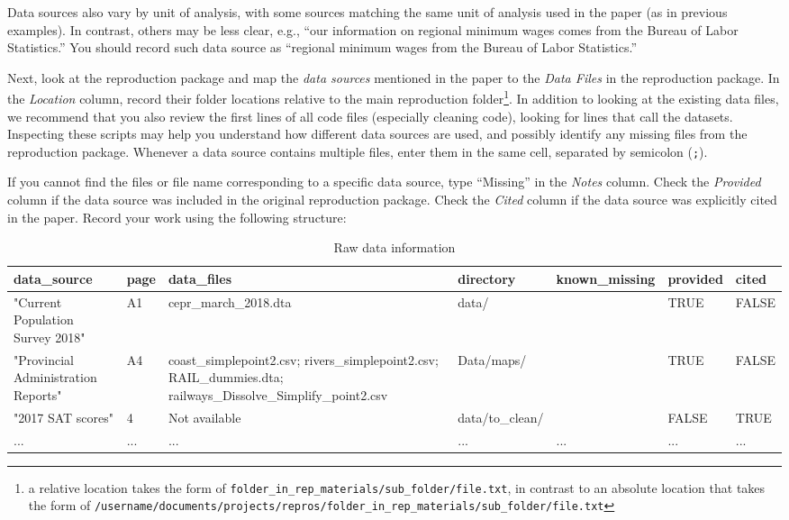 \documentclass[
]{book}
\begin{document}
Data sources also vary by unit of analysis, with some sources matching the same unit of analysis used in the paper (as in previous examples). In contrast, others may be less clear, e.g., ``our information on regional minimum wages comes from the Bureau of Labor Statistics.'' You should record such data source as ``regional minimum wages from the Bureau of Labor Statistics.''

Next, look at the reproduction package and map the \emph{data sources} mentioned in the paper to the \emph{Data Files} in the reproduction package. In the \emph{Location} column, record their folder locations relative to the main reproduction folder\footnote{a relative location takes the form of \texttt{folder\_in\_rep\_materials/sub\_folder/file.txt}, in contrast to an absolute location that takes the form of \texttt{/username/documents/projects/repros/folder\_in\_rep\_materials/sub\_folder/file.txt}}. In addition to looking at the existing data files, we recommend that you also review the first lines of all code files (especially cleaning code), looking for lines that call the datasets. Inspecting these scripts may help you understand how different data sources are used, and possibly identify any missing files from the reproduction package. Whenever a data source contains multiple files, enter them in the same cell, separated by semicolon (\texttt{;}).

If you cannot find the files or file name corresponding to a specific data source, type ``Missing'' in the \emph{Notes} column. Check the \emph{Provided} column if the data source was included in the original reproduction package. Check the \emph{Cited} column if the data source was explicitly cited in the paper. Record your work using the following structure:

\begin{table}

\caption{\label{tab:raw-data-information}Raw data information}
\centering
\begin{tabu} to 
\hline
data\_source & page & data\_files & directory & known\_missing & provided & cited\\
\hline
"Current Population Survey 2018" & A1 & cepr\_march\_2018.dta & data/ &  & TRUE & FALSE\\
\hline
"Provincial Administration Reports" & A4 & coast\_simplepoint2.csv; rivers\_simplepoint2.csv; RAIL\_dummies.dta; railways\_Dissolve\_Simplify\_point2.csv & Data/maps/ &  & TRUE & FALSE\\
\hline
"2017 SAT scores" & 4 & Not available & data/to\_clean/ &  & FALSE & TRUE\\
\hline
... & ... & ... & ... & ... & ... & ...\\
\hline
\end{tabu}
\end{table}
\end{document}
